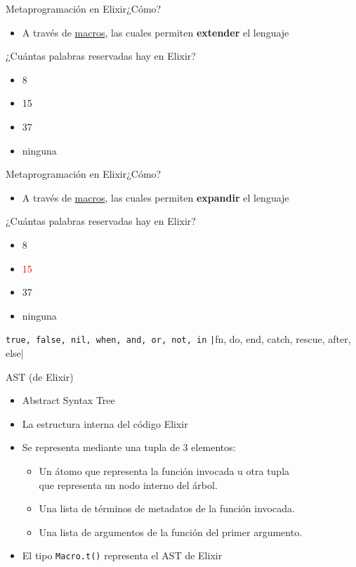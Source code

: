 \documentclass[14pt,aspectratio=169]{beamer}
\begin{document}
\begin{frame}{Metaprogramación en Elixir}{¿Cómo?}
  \begin{itemize}
    \item A través de \underline{macros}, las cuales permiten \textbf{extender}
    el lenguaje
  \end{itemize}
  \begin{block}{¿Cuántas palabras reservadas hay en Elixir?}
    \begin{itemize}
      \item 8
      \item 15
      \item 37
      \item ninguna
    \end{itemize}
  \end{block}
\end{frame}

\begin{frame}{Metaprogramación en Elixir}{¿Cómo?}
  \begin{itemize}
    \item A través de \underline{macros}, las cuales permiten \textbf{expandir}
    el lenguaje
  \end{itemize}
  \begin{block}{¿Cuántas palabras reservadas hay en Elixir?\footnotemark[1]}
    \begin{itemize}
      \item 8
      \item \textcolor{red}{15}
      \item 37
      \item ninguna
    \end{itemize}
    \texttt{true, false, nil, when, and, or, not, in}
    \texttt|fn, do, end, catch, rescue, after, else|
  \end{block}
\end{frame}

\begin{frame}{AST (de Elixir)}
  \begin{itemize}
    \item Abstract Syntax Tree
    \item La estructura interna del código Elixir
    \item Se representa mediante una tupla de 3 elementos:
    \begin{itemize}
      \item Un átomo que representa la función invocada u otra tupla\\
      que representa un nodo interno del árbol.
      \item Una lista de términos de metadatos de la función invocada.
      \item Una lista de argumentos de la función del primer argumento.
    \end{itemize}
    \item El tipo \texttt{Macro.t()} representa el AST de Elixir
  \end{itemize}
\end{frame}
\end{document}
